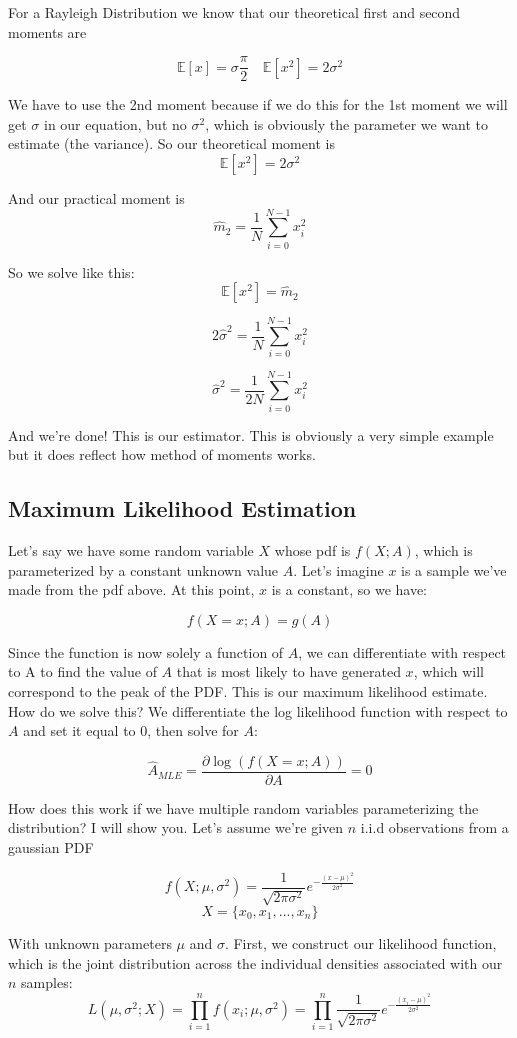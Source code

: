 \documentclass[12pt]{article}
\begin{document}
For a Rayleigh Distribution we know that our theoretical first and second moments are 

\[\mathbb{E}[x] = \sigma\frac{\pi}{2} \quad \mathbb{E}[x^2] = 2\sigma^2\]
 
We have to use the 2nd moment because if we do this for the 1st moment we will get \(\sigma\) in our equation, but no \(\sigma^2\), which is obviously the parameter we want to estimate (the variance). So our theoretical moment is 
\[\mathbb{E}[x^2] = 2\sigma^2\]

And our practical moment is 
\[\hat{m}_2 = \frac{1}{N}\sum_{i=0}^{N-1}x_i^2\]

So we solve like this:
\[\mathbb{E}[x^2] = \hat{m}_2\]

\[2\hat{\sigma}^2 = \frac{1}{N}\sum_{i=0}^{N-1}x_i^2\]

\[\hat{\sigma}^2 = \frac{1}{2N}\sum_{i=0}^{N-1}x_i^2\]

And we're done! This is our estimator. This is obviously a very simple example but it does reflect how method of moments works.
\subsection{Maximum Likelihood Estimation}
Let's say we have some random variable \(X\) whose pdf is \(f(X; A)\), which is parameterized by a constant unknown value \(A\). Let's imagine \(x\) is a sample we've made from the pdf above. At this point, \(x\) is a constant, so we have:

\[f(X=x; A) = g(A)\]

Since the function is now solely a function of \(A\), we can differentiate with respect to A to find the value of \(A\) that is most likely to have generated \(x\), which will correspond to the peak of the PDF. This is our maximum likelihood estimate. How do we solve this? We differentiate the log likelihood function with respect to \(A\) and set it equal to 0, then solve for \(A\):

\[\hat{A}_{MLE} = \frac{\partial \log(f(X=x; A) )}{\partial A} = 0\]

How does this work if we have multiple random variables parameterizing the distribution? I will show you. Let's assume we're given \(n\) i.i.d observations from a gaussian PDF

\[f(X; \mu, \sigma^2) =\frac{1}{\sqrt{2\pi\sigma^2}}e^{-\frac{(x-\mu)^2}{2\sigma^2}}\]
\[X = \{x_0, x_1,...,x_n\}\]

With unknown parameters \(\mu\) and \(\sigma\). First, we construct our likelihood function, which is the joint distribution across the individual densities associated with our \(n\) samples: 
\[L(\mu, \sigma^2; X) = \prod_{i=1}^n f(x_i; \mu, \sigma^2) = \prod_{i=1}^n \frac{1}{\sqrt{2\pi\sigma^2}}e^{-\frac{(x_i-\mu)^2}{2\sigma^2}}\]
\end{document}

